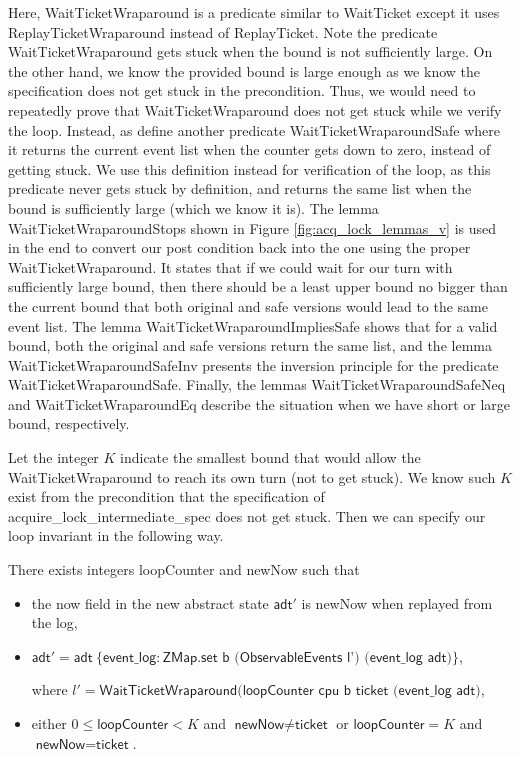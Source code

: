 Here, \textsf{WaitTicketWraparound} is a predicate similar to \textsf{WaitTicket} except it uses
\textsf{ReplayTicketWraparound} instead of \textsf{ReplayTicket}.
Note the predicate \textsf{WaitTicketWraparound} gets stuck when the bound is not sufficiently large.
On the other hand, we know the provided bound is large enough as we know the specification does
not get stuck in the precondition. Thus, we would need to repeatedly prove that \textsf{WaitTicketWraparound}
does not get stuck while we verify the loop. Instead, as define another predicate
\textsf{WaitTicketWraparoundSafe} where it returns the current event list when the counter gets down
to zero, instead of getting stuck. We use this definition instead for verification of the loop, as this
predicate never gets stuck by definition, and returns the same list when the bound is sufficiently large (which
we know it is). The lemma \textsf{WaitTicketWraparoundStops} shown in Figure \ref{fig:acq_lock_lemmas_v}
is used in the end to convert our post condition back into the one using the proper \textsf{WaitTicketWraparound}.
It states that if we could wait for our turn with sufficiently large bound, then there should be a least
upper bound no bigger than the current bound that both original and safe versions would lead to the same event list.
The lemma \textsf{WaitTicketWraparoundImpliesSafe} shows that for a valid bound, both the original
and safe versions return the same list, and the lemma \textsf{WaitTicketWraparoundSafeInv}
presents the inversion principle for the predicate \textsf{WaitTicketWraparoundSafe}.
Finally, the lemmas \textsf{WaitTicketWraparoundSafeNeq} and \textsf{WaitTicketWraparoundEq}
describe the situation when we have short or large bound, respectively.

Let the integer $K$ indicate the smallest bound that would allow the \textsf{WaitTicketWraparound}
to reach its own turn (not to get stuck). We know such $K$ exist from the precondition that the specification
of \textsf{acquire\_lock\_intermediate\_spec} does not get stuck. Then we can specify
our loop invariant in the following way. 

\begin{definition}
There exists integers \textsf{loopCounter} and \textsf{newNow} such that
\begin{itemize}
\item the \textsf{now} field in the new abstract state $\textsf{adt}'$ is \textsf{newNow} when replayed from the log,
\item $\textsf{adt}' = \textsf{adt}~\{\textsf{event\_log}: \textsf{ZMap.set b (ObservableEvents l') (event\_log adt)}\}$,


where $l' = \textsf{WaitTicketWraparound}(\textsf{loopCounter cpu b ticket (event\_log adt)}$,
\item either $0\le \textsf{loopCounter}<K$ and $\textsf{newNow}\neq\textsf{ticket}$ or
$\textsf{loopCounter}=K$ and $\textsf{newNow}=\textsf{ticket}$.
\end{itemize}
\end{definition}

